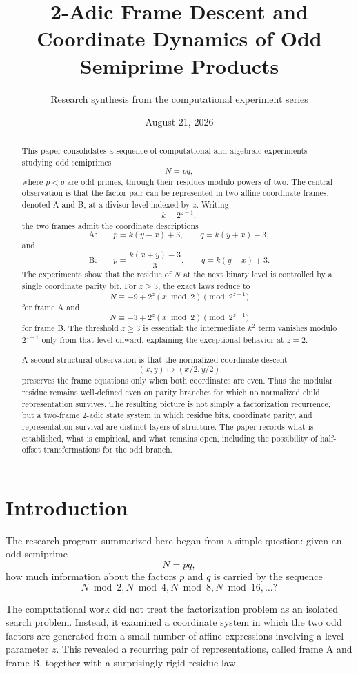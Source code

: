 \documentclass[11pt,a4paper]{article}
\title{2-Adic Frame Descent and Coordinate Dynamics of Odd Semiprime Products}
\author{Research synthesis from the computational experiment series}
\date{August 21, 2026}
\theoremstyle{definition}
\theoremstyle{remark}
\begin{document}
\maketitle

\begin{abstract}
This paper consolidates a sequence of computational and algebraic experiments studying odd semiprimes
\[
N=pq,
\]
where $p<q$ are odd primes, through their residues modulo powers of two. The central observation is that the factor pair can be represented in two affine coordinate frames, denoted A and B, at a divisor level indexed by $z$. Writing
\[
k=2^{z-1},
\]
the two frames admit the coordinate descriptions
\[
\text{A:}\qquad p=k(y-x)+3,\qquad q=k(y+x)-3,
\]
and
\[
\text{B:}\qquad p=\frac{k(x+y)-3}{3},\qquad q=k(y-x)+3.
\]
The experiments show that the residue of $N$ at the next binary level is controlled by a single coordinate parity bit. For $z\ge 3$, the exact laws reduce to
\[
N\equiv -9+2^z(x\bmod 2)\pmod{2^{z+1}}
\]
for frame A and
\[
N\equiv -3+2^z(x\bmod 2)\pmod{2^{z+1}}
\]
for frame B. The threshold $z\ge3$ is essential: the intermediate $k^2$ term vanishes modulo $2^{z+1}$ only from that level onward, explaining the exceptional behavior at $z=2$.

A second structural observation is that the normalized coordinate descent
\[
(x,y)\mapsto (x/2,y/2)
\]
preserves the frame equations only when both coordinates are even. Thus the modular residue remains well-defined even on parity branches for which no normalized child representation survives. The resulting picture is not simply a factorization recurrence, but a two-frame $2$-adic state system in which residue bits, coordinate parity, and representation survival are distinct layers of structure. The paper records what is established, what is empirical, and what remains open, including the possibility of half-offset transformations for the odd branch.
\end{abstract}

\section{Introduction}

The research program summarized here began from a simple question: given an odd semiprime
\[
N=pq,
\]
how much information about the factors $p$ and $q$ is carried by the sequence
\[
N\bmod 2,
N\bmod 4,
N\bmod 8,
N\bmod 16,\ldots?
\]

The computational work did not treat the factorization problem as an isolated search problem. Instead, it examined a coordinate system in which the two odd factors are generated from a small number of affine expressions involving a level parameter $z$. This revealed a recurring pair of representations, called frame A and frame B, together with a surprisingly rigid residue law.
\end{document}
